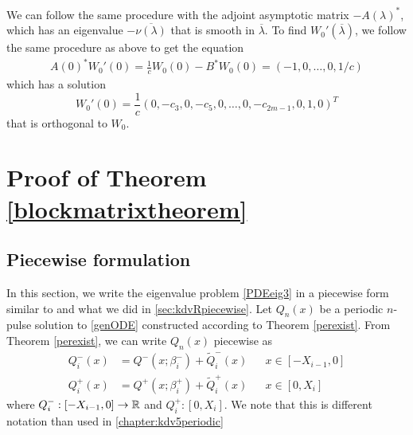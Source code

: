 \documentclass[thesis.tex]{subfiles}
\begin{document}
We can follow the same procedure with the adjoint asymptotic matrix $-A(\lambda)^*$, which has an eigenvalue $-\overline{\nu(\lambda)}$ that is smooth in $\overline{\lambda}$. To find $W_0'(\overline{\lambda})$, we follow the same procedure as above to get the equation
\begin{align*}
A(0)^* W_0'(0) = \frac{1}{c} W_0(0) - B^* W_0(0)
= (-1, 0, \dots, 0, 1/c)
\end{align*}
which has a solution 
\[
W_0'(0) = \frac{1}{c} \left( 0, -c_3, 0, -c_5, 0, \dots, 0, -c_{2m-1}, 0, 1, 0\right)^T
\]
that is orthogonal to $W_0$.

\section{Proof of Theorem \ref{blockmatrixtheorem} }

\subsection{Piecewise formulation}

In this section, we write the eigenvalue problem \cref{PDEeig3} in a piecewise form similar to \cite{Sandstede1998} and what we did in \cref{sec:kdvRpiecewise}. Let $Q_n(x)$ be a periodic $n$-pulse solution to \eqref{genODE} constructed according to Theorem \ref{perexist}. From Theorem \ref{perexist}, we can write $Q_n(x)$ piecewise as
\begin{equation}\label{Qnppiece}
\begin{aligned}
Q_i^-(x) &= Q^-(x; \beta_i^-) + \tilde{Q}_i^-(x) && x \in [-X_{i-1}, 0] \\
Q_i^+(x) &= Q^+(x; \beta_i^+) + \tilde{Q}_i^+(x) && x \in [0, X_i]
\end{aligned}
\end{equation}
where $Q_i^-: [-X_{i-1}, 0] \rightarrow \mathbb{R}$ and $Q_i^+: [0, X_i]$. We note that this is different notation than used in \cref{chapter:kdv5periodic}
\end{document}
